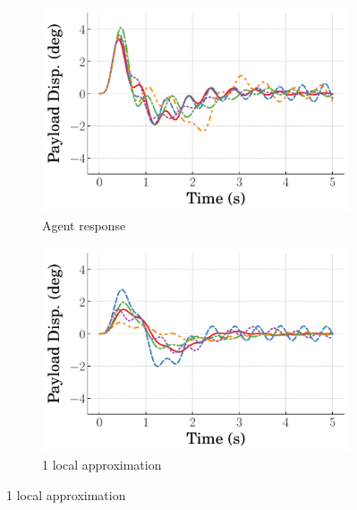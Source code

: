 \begin{figure}
    \centering
    \begin{subfigure}[b]{0.32\textwidth}
        \centering
        \includegraphics[width=\textwidth]{figures/figures_Interpretability/Mean_ISE_dpcrane_cubic_1_bins/curve_fit_time_responses/pure_RL/agent_0p18_Payload_Disp.pdf}
        \caption{Agent response}
        \label{subfig_chap5:dpcrane_pure_RL_payload_0.185_init_agent_unclipped}
    \end{subfigure}
    \hfill
    \begin{subfigure}[b]{0.32\textwidth}
        \centering
        \includegraphics[width=\textwidth]{figures/figures_Interpretability/Mean_ISE_dpcrane_cubic_1_bins/curve_fit_time_responses/pure_RL/curve_fit_0p18_Payload_Disp.pdf}
        \caption{1 local approximation}
        \label{subfig_chap5:dpcrane_pure_RL_payload_0.185_init_curve_fit_1_bins_unclipped}

\end{subfigure}
\end{figure}
